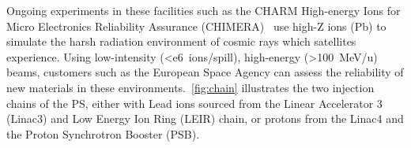 \documentclass[11pt]{report}
\begin{document}
Ongoing experiments in these facilities such as the CHARM High-energy Ions for Micro Electronics Reliability Assurance (CHIMERA)~\cite{Fraser:feasibility} use high-Z ions (Pb) to simulate the harsh radiation environment of cosmic rays which satellites experience. Using low-intensity (\qty{<e6}{ions/spill}), high-energy (\qty{>100}{\MeV / u}) beams, customers such as the European Space Agency can assess the reliability of new materials in these environments.~\autoref{fig:chain} illustrates the two injection chains of the PS, either with Lead ions sourced from the Linear Accelerator 3 (Linac3) and Low Energy Ion Ring (LEIR) chain, or protons from the Linac4 and the Proton Synchrotron Booster (PSB).

\begin{figure}

  \begin{tikzpicture}[x=0.75pt,y=0.75pt,yscale=-1,xscale=1]
  

\end{tikzpicture}
\end{figure}
\end{document}
